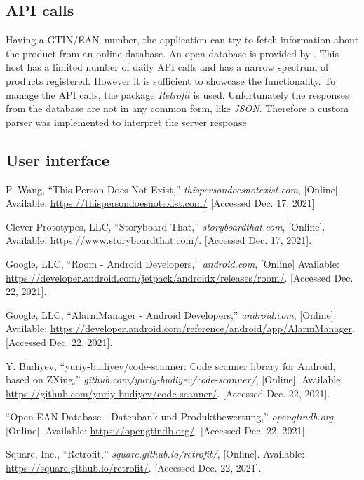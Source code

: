 \documentclass[conference]{IEEEtran}
\begin{document}
\subsection{API calls}

Having a GTIN/EAN--number, the application can try to fetch information about the product from an online database.
An open database is provided by \cite{eandatabase}. This host has a limited number of daily API calls and has a
narrow spectrum of products registered. However it is sufficient to showcase the functionality. To manage the API
calls, the package \textit{Retrofit} \cite{retrofit} is used. Unfortunately the responses from the database are not
in any common form, like \textit{JSON}. Therefore a custom parser was implemented to interpret the server response.

\subsection{User interface}

%

\newpage\hfill\newpage %
\begin{thebibliography}{00}	
	 P. Wang, ``This Person Does Not Exist,'' \textit{thispersondoesnotexist.com}, [Online]. Available: \url{https://thispersondoesnotexist.com/} [Accessed Dec. 17, 2021].

	 Clever Prototypes, LLC, ``Storyboard That,'' \textit{storyboardthat.com}, [Online]. Available: \url{https://www.storyboardthat.com/}. [Accessed Dec. 17, 2021].
	
	 Google, LLC, ``Room - Android Developers,'' \textit{android.com}, [Online] Available: \url{https://developer.android.com/jetpack/androidx/releases/room/}. [Accessed Dec. 22, 2021].
		
	 Google, LLC, ``AlarmManager - Android Developers,'' \textit{android.com}, [Online]. Available: \url{https://developer.android.com/reference/android/app/AlarmManager}. [Accessed Dec. 22, 2021].

	 Y. Budiyev, ``yuriy-budiyev/code-scanner: Code scanner library for Android, based on ZXing,'' \textit{github.com/yuriy-budiyev/code-scanner/}, [Online]. Available: \url{https://github.com/yuriy-budiyev/code-scanner/}. [Accessed Dec. 22, 2021].

	 ``Open EAN Database - Datenbank und Produktbewertung,'' \textit{opengtindb.org}, [Online]. Available: \url{https://opengtindb.org/}. [Accessed Dec. 22, 2021].
	
	 Square, Inc., ``Retrofit,'' \textit{square.github.io/retrofit/}, [Online]. Available: \url{https://square.github.io/retrofit/}. [Accessed Dec. 22, 2021].
\end{thebibliography}
\end{document}

